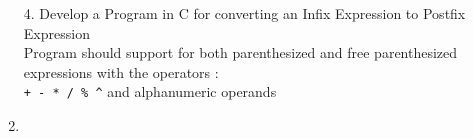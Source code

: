 \documentclass{article}
\newcommand{\answer}{\item [$\rightarrow$]}
\begin{document}
	\begin{enumerate}
		\item [4.] Develop a Program in C for converting an Infix Expression to Postfix Expression \\
		Program should support for both parenthesized and free parenthesized expressions with the operators : \\
		\verb|+ - * / % ^| and alphanumeric operands
		\answer \inputminted{c}{../Program4.c}
	\end{enumerate}
\end{document}
